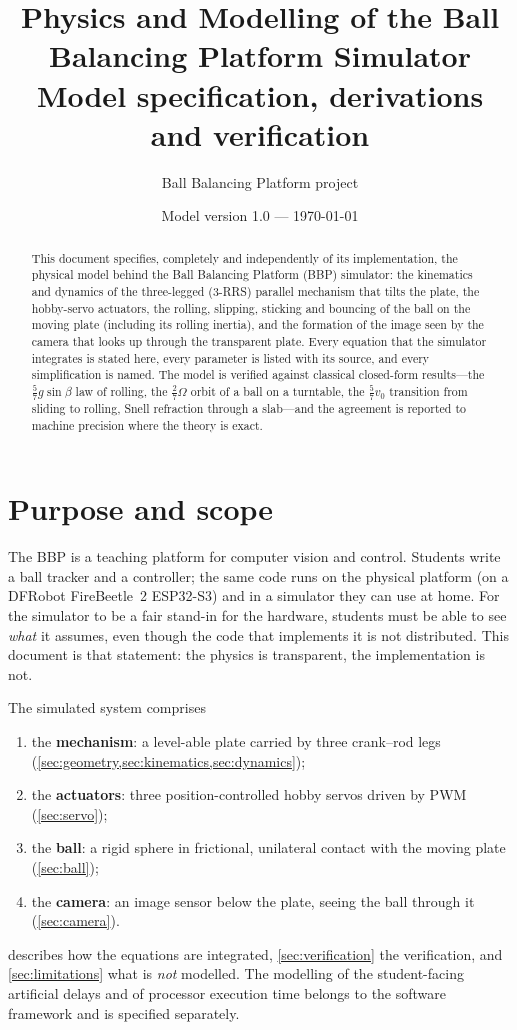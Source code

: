 \documentclass[10pt,a4paper]{article}
\title{Physics and Modelling of the Ball Balancing Platform Simulator\\[2pt]
\large Model specification, derivations and verification}
\author{Ball Balancing Platform project}
\date{Model version 1.0 --- \today}
\begin{document}
\maketitle

\begin{abstract}
This document specifies, completely and independently of its implementation, the physical
model behind the Ball Balancing Platform (BBP) simulator: the kinematics and dynamics of the
three-legged (3-RRS) parallel mechanism that tilts the plate, the hobby-servo actuators, the
rolling, slipping, sticking and bouncing of the ball on the moving plate (including its
rolling inertia), and the formation of the image seen by the camera that looks up through the
transparent plate. Every equation that the simulator integrates is stated here, every
parameter is listed with its source, and every simplification is named. The model is verified
against classical closed-form results---the $\frac{5}{7}g\sin\beta$ law of rolling, the
$\frac{2}{7}\Omega$ orbit of a ball on a turntable, the $\frac{5}{7}v_0$ transition from sliding
to rolling, Snell refraction through a slab---and the agreement is reported to machine
precision where the theory is exact.
\end{abstract}

\tableofcontents

\section{Purpose and scope}
The BBP is a teaching platform for computer vision and control. Students write a ball tracker
and a controller; the same code runs on the physical platform (on a DFRobot FireBeetle~2
ESP32-S3) and in a simulator they can use at home. For the simulator to be a fair stand-in for
the hardware, students must be able to see \emph{what} it assumes, even though the code that
implements it is not distributed. This document is that statement: the physics is transparent,
the implementation is not.

The simulated system comprises
\begin{enumerate}
  \item the \textbf{mechanism}: a level-able plate carried by three crank--rod legs
        (\cref{sec:geometry,sec:kinematics,sec:dynamics});
  \item the \textbf{actuators}: three position-controlled hobby servos driven by PWM
        (\cref{sec:servo});
  \item the \textbf{ball}: a rigid sphere in frictional, unilateral contact with the moving
        plate (\cref{sec:ball});
  \item the \textbf{camera}: an image sensor below the plate, seeing the ball through it
        (\cref{sec:camera}).
\end{enumerate}
 describes how the equations are integrated, \cref{sec:verification} the
verification, and \cref{sec:limitations} what is \emph{not} modelled. The modelling of the
student-facing artificial delays and of processor execution time belongs to the software
framework and is specified separately.
\end{document}
